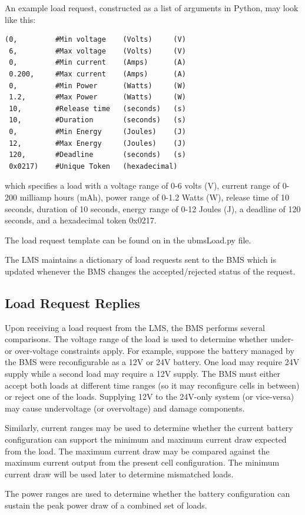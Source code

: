 \documentclass[11pt,conference,draftcls,onecolumn]{IEEEtran}
\begin{document}
An example load request, constructed as a list of arguments in Python, may look like this:
\begin{lstlisting}
(0,         #Min voltage    (Volts)     (V)
 6,         #Max voltage    (Volts)     (V)
 0,         #Min current    (Amps)      (A)
 0.200,     #Max current    (Amps)      (A)
 0,         #Min Power      (Watts)     (W)
 1.2,       #Max Power      (Watts)     (W)
 10,        #Release time   (seconds)   (s)
 10,        #Duration       (seconds)   (s)
 0,         #Min Energy     (Joules)    (J)
 12,        #Max Energy     (Joules)    (J)
 120,       #Deadline       (seconds)   (s)
 0x0217)    #Unique Token   (hexadecimal)
\end{lstlisting}
which specifies a load with a voltage range of 0-6 volts (V), current range of 0-200 milliamp hours (mAh), power range of 0-1.2 Watts (W), release time of 10 seconds, duration of 10 seconds, energy range of 0-12 Joules (J), a deadline of 120 seconds, and a hexadecimal token 0x0217.

The load request template can be found on in the ubmsLoad.py file.

The LMS maintains a dictionary of load requests sent to the BMS which is updated whenever the BMS changes the accepted/rejected status of the request. 

\subsection{Load Request Replies}
Upon receiving a load request from the LMS, the BMS performs several comparisons.
The voltage range of the load is used to determine whether under- or over-voltage constraints apply.
For example, suppose the battery managed by the BMS were reconfigurable as a 12V or 24V battery. One load may require 24V supply while a second load may require a 12V supply. The BMS must either accept both loads at different time ranges (so it may reconfigure cells in between) or reject one of the loads.
Supplying 12V to the 24V-only system (or vice-versa) may cause undervoltage (or overvoltage) and damage components.

Similarly, current ranges may be used to determine whether the current battery configuration can support the minimum and maximum current draw expected from the load.
The maximum current draw may be compared against the maximum current output from the present cell configuration.
The minimum current draw will be used later to determine mismatched loads.

The power ranges are used to determine whether the battery configuration can sustain the peak power draw of a combined set of loads.
\end{document}
